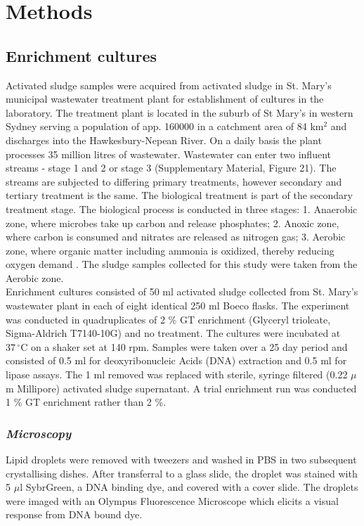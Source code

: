 \documentclass[twoside]{article}
\begin{document}
\section{Methods}
\thispagestyle{plain}
\subsection{Enrichment cultures}

Activated sludge samples were acquired from activated sludge in St. Mary’s municipal wastewater treat­ment plant for establishment of cultures in the laboratory. The treatment plant is located in the suburb of St Mary's in western Sydney serving a population of app. 160000 in a catchment area of 84 km$^{2}$ and discharges into the Hawkesbury-Nepean River. On a daily basis the plant processes 35 million litres of wastewater. Wastewater can enter two influent streams - stage 1 and 2 or stage 3 (Supplementary Material, Figure 21). The streams are subjected to differing primary treatments, however secondary and tertiary treatment is the same. The biological treatment is part of the secondary treatment stage. The biological process is conducted in three stages: 1. Anaerobic zone, where microbes take up carbon and release phosphates; 2. Anoxic zone, where carbon is consumed and nitrates are released as nitrogen gas; 3. Aerobic zone, where organic matter including ammonia is oxidized, thereby reducing oxygen demand \cite{stmarys}. The sludge samples collected for this study were taken from the Aerobic zone.\\


Enrichment cultures consisted of 50 ml activated sludge collected from St. Mary's wastewater plant in each of eight identical 250 ml Boeco flasks. The experiment was conducted in quadruplicates of 2 \% GT enrichment (Glyceryl trioleate, Sigma-Aldrich T7140-10G) and no treatment. The cultures were incubated at $37\,^{\circ}\mathrm{C}$ on a shaker set at 140 rpm. Samples were taken over a 25 day period and consisted of 0.5 ml for deoxyri­bonucleic Acids (DNA) extraction and 0.5 ml for lipase assays. The 1 ml removed was replaced with sterile, syringe filtered (0.22 $\mu$m Millipore) activated sludge supernatant. 
A trial enrichment run was conducted 1 \% GT enrichment rather than 2 \%.

\subsubsection{\emph{Microscopy}}
Lipid droplets were removed with tweezers and washed in PBS in two subsequent crystallising dishes. After transferral to a glass slide, the droplet was stained with 5 $\mu$l SybrGreen, a DNA binding dye, and covered with a cover slide. The droplets were imaged with an Olympus Fluorescence Microscope which elicits a visual response from DNA bound dye.
\end{document}

